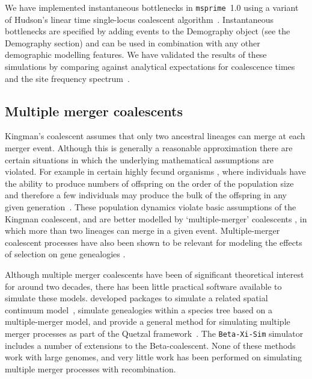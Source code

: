 \documentclass{article}
\newcommand{\msprime}[0]{\texttt{msprime}}
\begin{document}
We have implemented instantaneous bottlenecks in \msprime~1.0
using a variant of Hudson's linear time single-locus coalescent
algorithm~\citep{hudson1990gene}. Instantaneous bottlenecks are specified
by adding events to the Demography object (see the Demography section)
and can be used in combination with any other demographic modelling
features. We have validated the results of these simulations by comparing
against analytical expectations for coalescence times and the
site frequency spectrum~\citep{bunnefeld2015inferring}.

\subsection{Multiple merger coalescents}

Kingman's coalescent assumes that only two ancestral lineages can merge at
each merger event. Although this is generally a reasonable approximation there
are certain situations in which the underlying mathematical assumptions are
violated. For example in certain highly fecund organisms
\citep{hedgecock_94,B94,HP11,A04,irwin16}, where individuals have the ability
to produce numbers of offspring on the order of the population size and
therefore a few individuals may produce the bulk of the offspring in any given
generation~\citep{hedgecock_94}. These population dynamics violate basic
assumptions of the Kingman coalescent, and are better modelled by
`multiple-merger' coalescents \citep{DK99,P99,S99,S00,MS01}, in which more than
two lineages can merge in a given event. Multiple-merger coalescent processes
have also been shown to be relevant for modeling the effects of selection on
gene genealogies \citep{Gillespie909,DS04}.

Although multiple merger coalescents have been of significant theoretical
interest for around two decades, there has been little practical software
available to simulate these models.
\cite{kelleher2013coalescent,kelleher2014coalescent} developed packages to
simulate a related spatial continuum model~\citep{barton2010new},
\cite{zhu2015hybrid} simulate genealogies within a species tree
based on a multiple-merger model, and
\cite{becheler2020occupancy} provide a general method for simulating
multiple merger processes
as part of the Quetzal framework~\citep{becheler2019quetzal}.
The \texttt{Beta-Xi-Sim} simulator~\citep{koskela2018multi,koskela2019robust}
includes a number of extensions to the Beta-coalescent.
None of these methods work with large genomes, and very little work
has been performed on simulating multiple merger processes with recombination.
\end{document}
